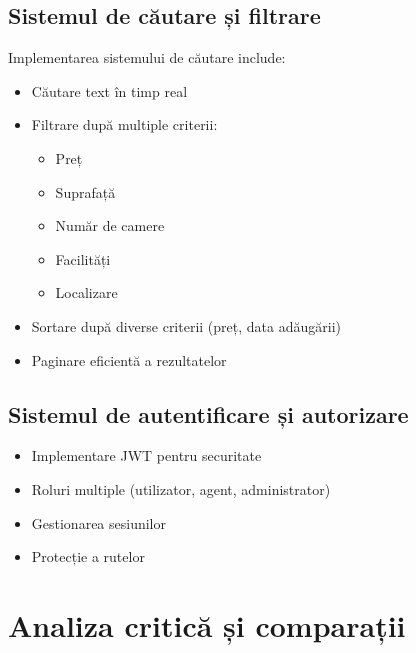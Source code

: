 \documentclass[12pt,a4paper]{report}
\begin{document}
\subsection{Sistemul de căutare și filtrare}
Implementarea sistemului de căutare include:
\begin{itemize}
    \item Căutare text în timp real
    \item Filtrare după multiple criterii:
    \begin{itemize}
        \item Preț
        \item Suprafață
        \item Număr de camere
        \item Facilități
        \item Localizare
    \end{itemize}
    \item Sortare după diverse criterii (preț, data adăugării)
    \item Paginare eficientă a rezultatelor
\end{itemize}

\subsection{Sistemul de autentificare și autorizare}
\begin{itemize}
    \item Implementare JWT pentru securitate
    \item Roluri multiple (utilizator, agent, administrator)
    \item Gestionarea sesiunilor
    \item Protecție a rutelor
\end{itemize}

\section{Analiza critică și comparații}
\end{document}
